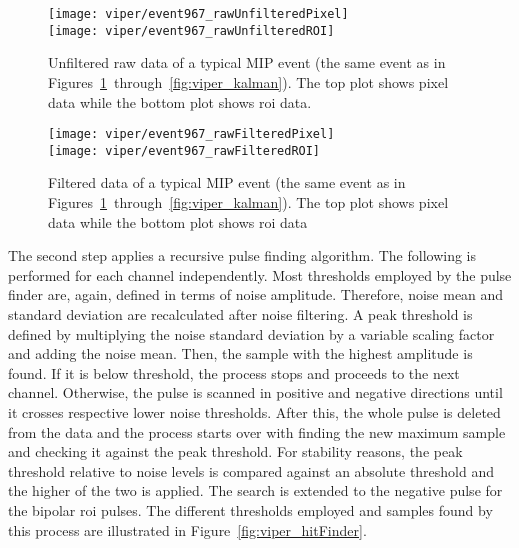 \begin{figure}[htb]
	\centering
	\texttt{[image: viper/event967\_rawUnfilteredPixel]}\\
	\texttt{[image: viper/event967\_rawUnfilteredROI]}
	\caption{Unfiltered raw data of a typical MIP event (the same event as in Figures~\ref{fig:viper_unfilteredRawData}~through~\ref{fig:viper_kalman}). The top plot shows pixel data while the bottom plot shows \gls{roi} data.}
	\label{fig:viper_unfilteredRawData}
\end{figure}

\begin{figure}[htb]
	\centering
	\texttt{[image: viper/event967\_rawFilteredPixel]}\\
	\texttt{[image: viper/event967\_rawFilteredROI]}
	\caption{Filtered data of a typical MIP event (the same event as in Figures~\ref{fig:viper_unfilteredRawData}~through~\ref{fig:viper_kalman}).
	The top plot shows pixel data while the bottom plot shows \gls{roi} data}
	\label{fig:viper_filteredRawData}
\end{figure}

The second step applies a recursive pulse finding algorithm.
The following is performed for each channel independently.
Most thresholds employed by the pulse finder are, again, defined in terms of noise amplitude.
Therefore, noise mean and standard deviation are recalculated after noise filtering.
A peak threshold is defined by multiplying the noise standard deviation by a variable scaling factor and adding the noise mean.
Then, the sample with the highest amplitude is found.
If it is below threshold, the process stops and proceeds to the next channel.
Otherwise, the pulse is scanned in positive and negative directions until it crosses respective lower noise thresholds.
After this, the whole pulse is deleted from the data and the process starts over with finding the new maximum sample and checking it against the peak threshold.
For stability reasons, the peak threshold relative to noise levels is compared against an absolute threshold and the higher of the two is applied.
The search is extended to the negative pulse for the bipolar \gls{roi} pulses.
The different thresholds employed and samples found by this process are illustrated in Figure~\ref{fig:viper_hitFinder}.

